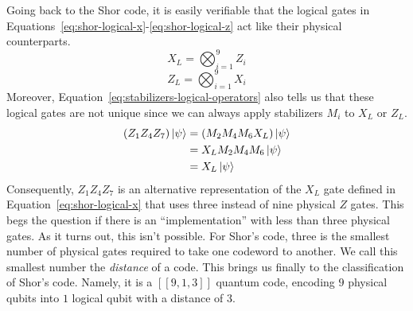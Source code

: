Going back to the Shor code, it is easily verifiable that the logical gates in Equations~\ref{eq:shor-logical-x}-\ref{eq:shor-logical-z} act like their physical counterparts.
\begin{equation}\label{eq:shor-logical-x}
    X_L = \bigotimes_{i=1}^{9}Z_{i}
\end{equation}
\begin{equation}\label{eq:shor-logical-z}
    Z_L = \bigotimes_{i=1}^{9}X_{i}
\end{equation}
Moreover, Equation~\ref{eq:stabilizers-logical-operators} also tells us that these logical gates are not unique since we can always apply stabilizers $M_i$ to $X_L$ or $Z_L$.
\begin{equation}
    \begin{aligned}
        (Z_{1}Z_{4}Z_{7})\ket{\psi} &= (M_{2}M_{4}M_{6}X_{L})\ket{\psi} \\
        &= X_{L}M_{2}M_{4}M_{6}\ket{\psi} \\
        &= X_{L}\ket{\psi}
    \end{aligned}
\end{equation}
Consequently, $Z_{1}Z_{4}Z_{7}$ is an alternative representation of the $X_L$ gate defined in Equation~\ref{eq:shor-logical-x} that uses three instead of nine physical $Z$ gates. This begs the question if there is an ``implementation'' with less than three physical gates. As it turns out, this isn't possible. For Shor's code, three is the smallest number of physical gates required to take one codeword to another. We call this smallest number the \textit{distance} of a code. This brings us finally to the classification of Shor's code. Namely, it is a $[[9,1,3]]$ quantum code, encoding $9$ physical qubits into $1$ logical qubit with a distance of $3$.